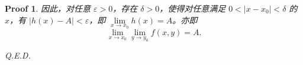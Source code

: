 \documentclass[a4paper,12pt]{article}
\newtheorem*{pf}{Proof}
\begin{document}
\begin{enumerate}
\begin{enumerate}[label=(\arabic*)]
\begin{pf}
                              因此，对任意 $\varepsilon > 0$，存在 $\delta > 0$，使得对任意满足 $0 < |x-x_0| < \delta$ 的 $x$，有 $|h(x)-A| < \varepsilon$，即 $\lim\limits_{x \to x_0} h(x) = A$。亦即
                              $$
                                    \lim_{x \to x_0} \lim_{y \to y_0} f(x,y) = A.
                              $$

                              Q.E.D.
                        \end{pf}
            \end{enumerate}
\end{enumerate}
\end{document}
